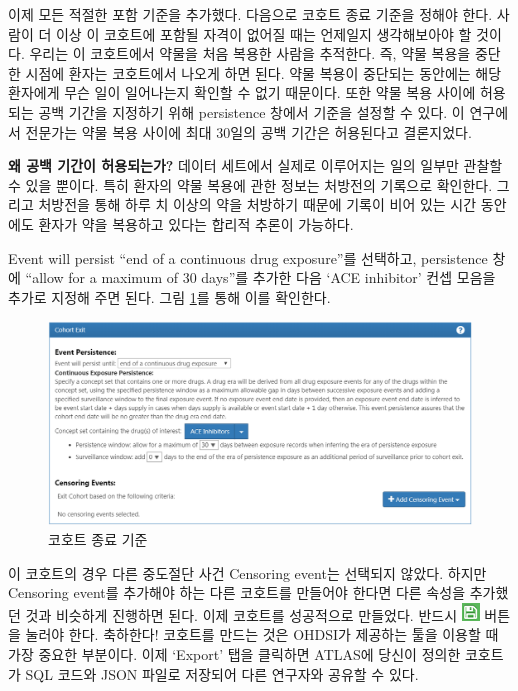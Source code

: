 \documentclass[10.5pt]{book}
\theoremstyle{definition}
\theoremstyle{definition}
\theoremstyle{definition}
\theoremstyle{remark}
\begin{document}
이제 모든 적절한 포함 기준을 추가했다. 다음으로 코호트 종료 기준을
정해야 한다. 사람이 더 이상 이 코호트에 포함될 자격이 없어질 때는
언제일지 생각해보아야 할 것이다. 우리는 이 코호트에서 약물을 처음 복용한
사람을 추적한다. 즉, 약물 복용을 중단한 시점에 환자는 코호트에서 나오게
하면 된다. 약물 복용이 중단되는 동안에는 해당 환자에게 무슨 일이
일어나는지 확인할 수 없기 때문이다. 또한 약물 복용 사이에 허용되는 공백
기간을 지정하기 위해 persistence 창에서 기준을 설정할 수 있다. 이
연구에서 전문가는 약물 복용 사이에 최대 30일의 공백 기간은 허용된다고
결론지었다.

\textbf{왜 공백 기간이 허용되는가?} 데이터 세트에서 실제로 이루어지는
일의 일부만 관찰할 수 있을 뿐이다. 특히 환자의 약물 복용에 관한 정보는
처방전의 기록으로 확인한다. 그리고 처방전을 통해 하루 치 이상의 약을
처방하기 때문에 기록이 비어 있는 시간 동안에도 환자가 약을 복용하고
있다는 합리적 추론이 가능하다.

Event will persist ``end of a continuous drug exposure''를 선택하고,
persistence 창에 ``allow for a maximum of 30 days''를 추가한 다음 `ACE
inhibitor' 컨셉 모음을 추가로 지정해 주면 된다. 그림
\ref{fig:ATLAScohortexit}를 통해 이를 확인한다.

\begin{figure}

{\centering \includegraphics[width=1\linewidth]{images/Cohorts/cohort-exit} 

}

\caption{코호트 종료 기준}\label{fig:ATLAScohortexit}
\end{figure}

이 코호트의 경우 다른 중도절단 사건 Censoring event는 선택되지 않았다.
하지만 Censoring event를 추가해야 하는 다른 코호트를 만들어야 한다면
다른 속성을 추가했던 것과 비슷하게 진행하면 된다. 이제 코호트를
성공적으로 만들었다. 반드시 \includegraphics{images/Cohorts/save.png}
버튼을 눌러야 한다. 축하한다! 코호트를 만드는 것은 OHDSI가 제공하는 툴을
이용할 때 가장 중요한 부분이다. 이제 `Export' 탭을 클릭하면 ATLAS에
당신이 정의한 코호트가 SQL 코드와 JSON 파일로 저장되어 다른 연구자와
공유할 수 있다.
\end{document}
